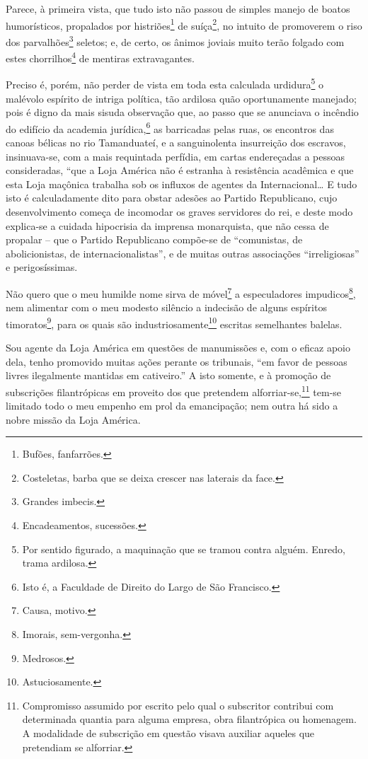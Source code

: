 Parece, à primeira vista, que tudo isto não passou de simples manejo de
boatos humorísticos, propalados por histriões\footnote{ Bufões,
  fanfarrões.} de suíça\footnote{ Costeletas, barba que se deixa
  crescer nas laterais da face.}, no intuito de promoverem o riso dos
parvalhões\footnote{ Grandes imbecis.} seletos; e, de certo, os ânimos
joviais muito terão folgado com estes chorrilhos\footnote{
  Encadeamentos, sucessões.} de mentiras extravagantes.

Preciso é, porém, não perder de vista em toda esta calculada
urdidura\footnote{ Por sentido figurado, a maquinação que se tramou
  contra alguém. Enredo, trama ardilosa.} o malévolo espírito de intriga
política, tão ardilosa quão oportunamente manejado; pois é digno da mais
sisuda observação que, ao passo que se anunciava o incêndio do edifício
da academia jurídica,\footnote{ Isto é, a Faculdade de Direito do Largo
  de São Francisco.} as barricadas pelas ruas, os encontros das canoas
bélicas no rio Tamanduateí, e a sanguinolenta insurreição dos escravos,
insinuava-se, com a mais requintada perfídia, em cartas endereçadas a
pessoas consideradas, ``que a Loja América não é estranha à resistência
acadêmica e que esta Loja maçônica trabalha sob os influxos de agentes
da Internacional\ldots{} E tudo isto é calculadamente dito para obstar
adesões ao Partido Republicano, cujo desenvolvimento começa de incomodar
os graves servidores do rei, e deste modo explica-se a cuidada
hipocrisia da imprensa monarquista, que não cessa de propalar -- que o
Partido Republicano compõe-se de ``comunistas, de abolicionistas, de
internacionalistas'', e de muitas outras associações ``irreligiosas'' e
perigosíssimas.

Não quero que o meu humilde nome sirva de móvel\footnote{ Causa,
  motivo.} a especuladores impudicos\footnote{ Imorais, sem-vergonha.},
nem alimentar com o meu modesto silêncio a indecisão de alguns espíritos
timoratos\footnote{ Medrosos.}, para os quais são
industriosamente\footnote{ Astuciosamente.} escritas semelhantes
balelas.

Sou agente da Loja América em questões de manumissões e, com o eficaz
apoio dela, tenho promovido muitas ações perante os tribunais, ``em favor
de pessoas livres ilegalmente mantidas em cativeiro.'' A isto somente, e
à promoção de subscrições filantrópicas em proveito dos que pretendem
alforriar-se,\footnote{ Compromisso assumido por escrito pelo qual o
  subscritor contribui com determinada quantia para alguma empresa, obra
  filantrópica ou homenagem. A modalidade de subscrição em questão
  visava auxiliar aqueles que pretendiam se alforriar.} tem-se limitado
todo o meu empenho em prol da emancipação; nem outra há sido a nobre
missão da Loja América.

